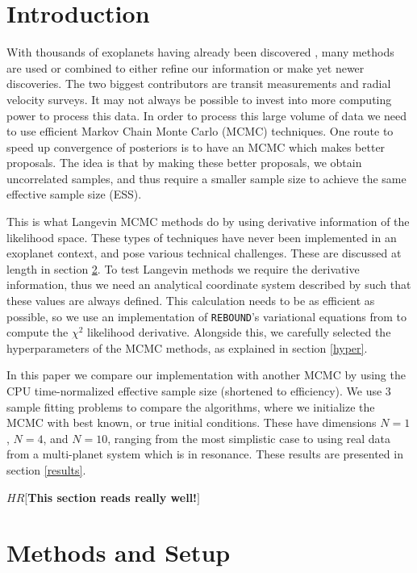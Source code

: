 \documentclass{aa}
\def\memohr#1{\color{blue}$HR[${\bf #1}$]$ \color{black}}
\newcommand{\reb}{{\sc \tt REBOUND}\xspace}
\begin{document}
\section{Introduction}
With thousands of exoplanets having already been discovered \cite{exoArchive}, many methods are used or combined to either refine our information or make yet newer discoveries. 
The two biggest contributors are transit measurements and radial velocity surveys. 
It may not always be possible to invest into more computing power to process this data. 
In order to process this large volume of data we need to use efficient Markov Chain Monte Carlo (MCMC) techniques. 
One route to speed up convergence of posteriors is to have an MCMC which makes better proposals. 
The idea is that by making these better proposals, we obtain uncorrelated samples, and thus require a smaller sample size to achieve the same effective sample size (ESS).

This is what Langevin MCMC methods do by using derivative information of the likelihood space. 
These types of techniques have never been implemented in an exoplanet context, and pose various technical challenges. 
These are discussed at length in section \ref{setup}. 
To test Langevin methods we require the derivative information, thus we need an analytical coordinate system described by \cite{Pl2009} such that these values are always defined. 
This calculation needs to be as efficient as possible, so we use an implementation of \reb's variational equations from \cite{Rein2016} to compute the $\chi^2$ likelihood derivative. 
Alongside this, we carefully selected the hyperparameters of the MCMC methods, as explained in section \ref{hyper}.

In this paper we compare our implementation with another MCMC by using the CPU time-normalized effective sample size (shortened to efficiency). 
We use 3 sample fitting problems to compare the algorithms, where we initialize the MCMC with best known, or true initial conditions. 
These have dimensions $N=1$, $N=4$, and $N=10$, ranging from the most simplistic case to using real data from a multi-planet system which is in resonance. 
These results are presented in section \ref{results}.

\memohr{This section reads really well!}
 
\section{Methods and Setup}\label{setup}
\end{document}

